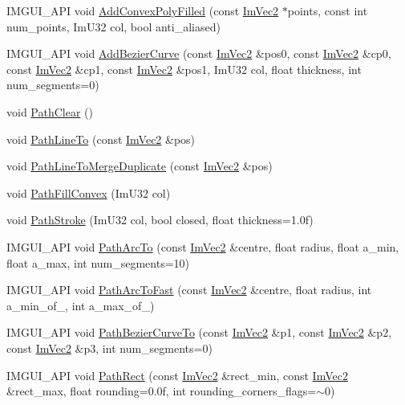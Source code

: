 \begin{DoxyCompactItemize}
\item 
I\+M\+G\+U\+I\+\_\+\+A\+PI void \hyperlink{struct_im_draw_list_a3ba618d0615e410dce9eaa0b80a30126}{Add\+Convex\+Poly\+Filled} (const \hyperlink{struct_im_vec2}{Im\+Vec2} $\ast$points, const int num\+\_\+points, Im\+U32 col, bool anti\+\_\+aliased)
\item 
I\+M\+G\+U\+I\+\_\+\+A\+PI void \hyperlink{struct_im_draw_list_afd2eeeb8ed23b6222513953b03620101}{Add\+Bezier\+Curve} (const \hyperlink{struct_im_vec2}{Im\+Vec2} \&pos0, const \hyperlink{struct_im_vec2}{Im\+Vec2} \&cp0, const \hyperlink{struct_im_vec2}{Im\+Vec2} \&cp1, const \hyperlink{struct_im_vec2}{Im\+Vec2} \&pos1, Im\+U32 col, float thickness, int num\+\_\+segments=0)
\item 
void \hyperlink{struct_im_draw_list_ae9ad5f4d638b1bfd9383618dc60e3f18}{Path\+Clear} ()
\item 
void \hyperlink{struct_im_draw_list_a828d944325ed58d8b57abd3647bffaaf}{Path\+Line\+To} (const \hyperlink{struct_im_vec2}{Im\+Vec2} \&pos)
\item 
void \hyperlink{struct_im_draw_list_aa3dd11945fb62495f8b9e1392ed724e3}{Path\+Line\+To\+Merge\+Duplicate} (const \hyperlink{struct_im_vec2}{Im\+Vec2} \&pos)
\item 
void \hyperlink{struct_im_draw_list_aea9301cb99ebf4b27f5d3959017567c9}{Path\+Fill\+Convex} (Im\+U32 col)
\item 
void \hyperlink{struct_im_draw_list_ac3172e376a4b77915bb22b6d8092b8b2}{Path\+Stroke} (Im\+U32 col, bool closed, float thickness=1.\+0f)
\item 
I\+M\+G\+U\+I\+\_\+\+A\+PI void \hyperlink{struct_im_draw_list_acb69ef7febcc54c9e5e09d2460c85b61}{Path\+Arc\+To} (const \hyperlink{struct_im_vec2}{Im\+Vec2} \&centre, float radius, float a\+\_\+min, float a\+\_\+max, int num\+\_\+segments=10)
\item 
I\+M\+G\+U\+I\+\_\+\+A\+PI void \hyperlink{struct_im_draw_list_a713cca3862e88aa1ee671db1c4cf6bdb}{Path\+Arc\+To\+Fast} (const \hyperlink{struct_im_vec2}{Im\+Vec2} \&centre, float radius, int a\+\_\+min\+\_\+of\+\_, int a\+\_\+max\+\_\+of\+\_)
\item 
I\+M\+G\+U\+I\+\_\+\+A\+PI void \hyperlink{struct_im_draw_list_a495ca7dd4fd5a898e2414658321f4b18}{Path\+Bezier\+Curve\+To} (const \hyperlink{struct_im_vec2}{Im\+Vec2} \&p1, const \hyperlink{struct_im_vec2}{Im\+Vec2} \&p2, const \hyperlink{struct_im_vec2}{Im\+Vec2} \&p3, int num\+\_\+segments=0)
\item 
I\+M\+G\+U\+I\+\_\+\+A\+PI void \hyperlink{struct_im_draw_list_a1b63e7c7bbb70f8a7be2b227a3d3f802}{Path\+Rect} (const \hyperlink{struct_im_vec2}{Im\+Vec2} \&rect\+\_\+min, const \hyperlink{struct_im_vec2}{Im\+Vec2} \&rect\+\_\+max, float rounding=0.\+0f, int rounding\+\_\+corners\+\_\+flags=$\sim$0)

\end{DoxyCompactItemize}
